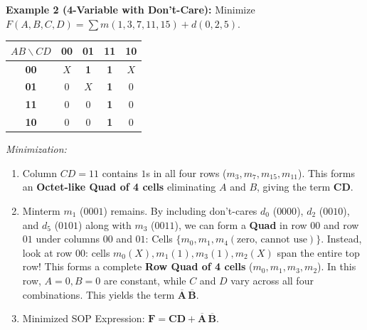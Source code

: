 \textbf{Example 2 (4-Variable with Don't-Care):}
Minimize $F(A, B, C, D) = \sum m(1, 3, 7, 11, 15) + d(0, 2, 5)$.
\begin{center}
\small
\begin{tabular}{|c|c|c|c|c|}
\hline
$AB \backslash CD$ & \textbf{00} & \textbf{01} & \textbf{11} & \textbf{10} \\
\hline
\textbf{00} & $X$ & \textbf{1} & \textbf{1} & $X$ \\
\hline
\textbf{01} & 0 & $X$ & \textbf{1} & 0 \\
\hline
\textbf{11} & 0 & 0 & \textbf{1} & 0 \\
\hline
\textbf{10} & 0 & 0 & \textbf{1} & 0 \\
\hline
\end{tabular}
\end{center}
\textit{Minimization:}
\begin{enumerate}[label=\bfseries\alph*.]
    \item Column $CD = 11$ contains $1$s in all four rows ($m_3, m_7, m_{15}, m_{11}$). This forms an \textbf{Octet-like Quad of 4 cells} eliminating $A$ and $B$, giving the term $\mathbf{CD}$.
    \item Minterm $m_1$ ($0001$) remains. By including don't-cares $d_0$ ($0000$), $d_2$ ($0010$), and $d_5$ ($0101$) along with $m_3$ ($0011$), we can form a \textbf{Quad} in row $00$ and row $01$ under columns $00$ and $01$:
    Cells $\{m_0, m_1, m_4(\text{zero, cannot use})\}$.
    Instead, look at row $00$: cells $m_0(X), m_1(1), m_3(1), m_2(X)$ span the entire top row!
    This forms a complete \textbf{Row Quad of 4 cells} ($m_0, m_1, m_3, m_2$). In this row, $A=0, B=0$ are constant, while $C$ and $D$ vary across all four combinations. This yields the term $\mathbf{\overline{A}\,\overline{B}}$.
    \item Minimized SOP Expression: $\mathbf{F = CD + \overline{A}\,\overline{B}}$.
\end{enumerate}


